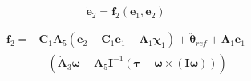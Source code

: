 \[
\dot{\mathbf{e}}_2 = \mathbf{f}_2 \left( \mathbf{e}_1, \mathbf{e}_2 \right)
\]


\begin{align}
\nonumber
\mathbf{f}_2 = &
\mathbf{C}_1 \mathbf{A}_5 \left( \mathbf{e}_2 - \mathbf{C}_1 \mathbf{e}_1 - \boldsymbol\Lambda_1 \boldsymbol\chi_1 \right) +
\ddot{\boldsymbol\theta}_{ref} +
\boldsymbol\Lambda_1 \mathbf{e}_1 \\
&- \left(
	\dot{\mathbf{A}}_3 \boldsymbol\omega
	+ \mathbf{A}_5 \mathbf{I}^{-1} \left( \boldsymbol\tau - \boldsymbol\omega \times \left( \mathbf{I} \boldsymbol\omega \right) \right)
\right)
\label{eq:}
\end{align}



